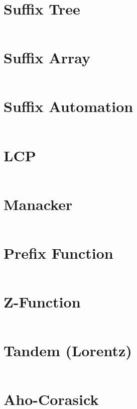 \documentclass{article}
\begin{document}
\begin{multicols}{2}
\section*{Suffix Tree}
\inputminted[frame=single,breaklines]{cpp}{../suffix-tree.cpp}

\section*{Suffix Array}
\inputminted[frame=single,breaklines]{cpp}{../suffix-array.cpp}

\section*{Suffix Automation}
\inputminted[frame=single,breaklines]{cpp}{../suffix-automation.cpp}

\section*{LCP}
\inputminted[frame=single,breaklines]{cpp}{../Kasai-Li.cpp}

\section*{Manacker}
\inputminted[frame=single,breaklines]{cpp}{../manacker.cpp}

\section*{Prefix Function}
\inputminted[frame=single,breaklines]{cpp}{../P-function.cpp}

\section*{Z-Function}
\inputminted[frame=single,breaklines]{cpp}{../Z-function.cpp}

\section*{Tandem (Lorentz)}
\inputminted[frame=single,breaklines]{cpp}{../main-lorentz.cpp}

\section*{Aho-Corasick}
\inputminted[frame=single,breaklines]{cpp}{../aho-corasick.cpp}


\end{multicols}
\end{document}

